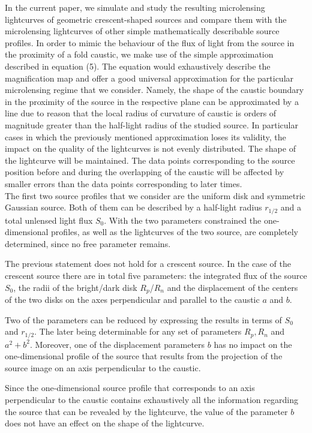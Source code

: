 \documentclass[usenatbib]{mn2e}
\begin{document}
In the current paper, we simulate and study the resulting microlensing lightcurves of geometric crescent-shaped sources 
and compare them with the microlensing lightcurves of other simple mathematically describable source profiles. 
In order to mimic the behaviour of the flux of light from the source in the proximity of a fold caustic, we make use of the simple approximation described in equation (5). 
The equation would exhaustively describe the magnification map and offer a good universal approximation for the 
particular microlensing regime that we consider. 
Namely, the shape of the caustic boundary in the proximity of the source in the respective plane can be approximated by
 a line due to reason that the local radius of curvature of caustic is orders of magnitude greater than the half-light
 radius of the studied source. 
In particular cases in which the previously mentioned approximation loses its validity, the impact on the quality of the 
lightcurves is not evenly distributed. The shape of the lightcurve will be maintained. 
The data points corresponding to the source position before and during the overlapping of the caustic will be affected by
 smaller errors than the data points corresponding to later times. \\

The first two source profiles that we consider are the uniform disk and symmetric Gaussian source. 
Both of them can be described by a half-light radius $r_{1/2}$ and a total unlensed light flux $S_0$. 
With the two parameters constrained the one-dimensional profiles, as well as the lightcurves of the two source, are completely determined, since no free parameter remains. 

The previous statement does not hold for a crescent source.
In the case of the crescent source there are in total five parameters: the integrated flux of the source $S_0$,
 the radii of the bright/dark disk $R_p$/$R_n$ and the displacement of the centers of the two disks on the axes perpendicular and parallel to the caustic $a$ and $b$. 

Two of the parameters can be reduced by expressing the results in terms of $S_0$ and $r_{1/2}$. 
The later being determinable for any set of parameters $R_p, R_n$ and $a^2+b^2$. Moreover, one of the displacement 
parameters $b$ has no impact on the one-dimensional profile of the source that results from the projection of the source image on an axis perpendicular to the caustic. 

Since the one-dimensional source profile that corresponds to an axis perpendicular to the caustic contains exhaustively all the information regarding the source that can be revealed by the lightcurve, 
the value of the parameter $b$ does not have an effect on the shape of the lightcurve. 
\end{document}
